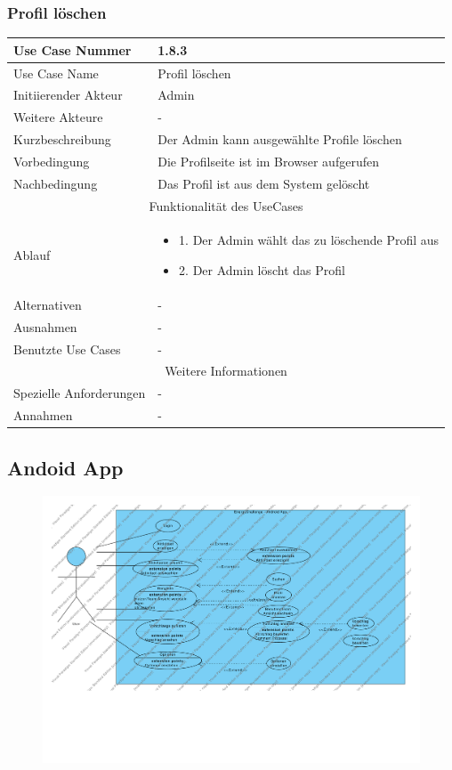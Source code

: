 \documentclass[10pt,a4paper]{article}
\begin{document}
			\subsubsection{Profil l\"oschen}
		\begin{tabular}{|l|p{.5\linewidth}|}
		\hline Use Case Nummer & 1.8.3 \\ 
		\hline Use Case Name & Profil l\"oschen \\ 
		\hline Initiierender Akteur & Admin \\
		\hline Weitere Akteure & - \\
		\hline Kurzbeschreibung & Der Admin kann ausgew\"ahlte Profile l\"oschen \\
		\hline Vorbedingung & Die Profilseite ist im Browser aufgerufen \\
		\hline Nachbedingung & Das Profil ist aus dem System gel\"oscht \\
		\hline \multicolumn{2}{|c|}{Funktionalität des UseCases}\\
		\hline  Ablauf & \begin{itemize}
					\item 1. Der Admin w\"ahlt das zu löschende Profil aus
					\item 2. Der Admin l\"oscht das Profil
				\end{itemize}\\
		\hline Alternativen & - \\
		\hline Ausnahmen & - \\
		\hline Benutzte Use Cases & - \\
		\hline \multicolumn{2}{|c|}{Weitere Informationen} \\
		\hline Spezielle Anforderungen & - \\
		\hline Annahmen & - \\
		\hline
		\end{tabular}
\subsection{Andoid App}
\begin{figure}[h]
		\includegraphics[width=\linewidth]{gfx/androidapp/overview.pdf}
	\end{figure}
\end{document}
